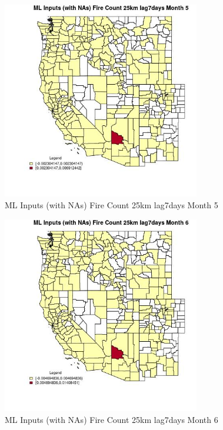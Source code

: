 \clearpage 

\begin{figure} 
\centering  
\includegraphics[width=0.77\textwidth]{Code_Outputs/Report_ML_input_PM25_Step4_part_e_de_duplicated_aves_compiled_2019-05-21wNAs_CountyFire_Count_25km_lag7daysmedianMonth5.jpg} 
\caption{\label{fig:Report_ML_input_PM25_Step4_part_e_de_duplicated_aves_compiled_2019-05-21wNAsCountyFire_Count_25km_lag7daysmedianMonth5}ML Inputs (with NAs) Fire Count 25km lag7days Month 5} 
\end{figure} 
 

\begin{figure} 
\centering  
\includegraphics[width=0.77\textwidth]{Code_Outputs/Report_ML_input_PM25_Step4_part_e_de_duplicated_aves_compiled_2019-05-21wNAs_CountyFire_Count_25km_lag7daysmedianMonth6.jpg} 
\caption{\label{fig:Report_ML_input_PM25_Step4_part_e_de_duplicated_aves_compiled_2019-05-21wNAsCountyFire_Count_25km_lag7daysmedianMonth6}ML Inputs (with NAs) Fire Count 25km lag7days Month 6} 
\end{figure} 
 


